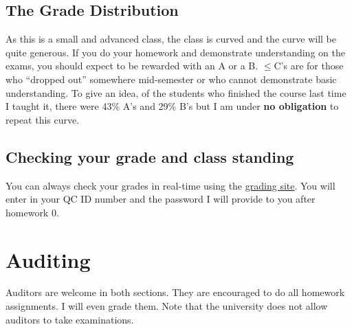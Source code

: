 \documentclass[12pt]{article}
\newcommand{\inred}[1]{\color{red}\textbf{#1} \color{black}}
\newcommand{\qu}[1]{``#1''}
\begin{document}
\subsection*{The Grade Distribution}

As this is a small and advanced class, the class is curved and the curve will be quite generous. If you do your homework and demonstrate understanding on the exams, you should expect to be rewarded with an A or a B. $\leq$C's are for those who \qu{dropped out} somewhere mid-semester or who cannot demonstrate basic understanding. To give an idea, of the students who finished the course last time I taught it, there were 43\% A's and 29\% B's but I am under \inred{no obligation} to repeat this curve.

\subsection*{Checking your grade and class standing}

You can always check your grades in real-time using the \href{http://gradesly.com}{grading site}. You will enter in your QC ID number and the password I will provide to you after homework 0.



\section*{Auditing}

Auditors are welcome in both sections. They are encouraged to do all homework assignments. I will even grade them. Note that the university does not allow auditors to take examinations.
\end{document}
